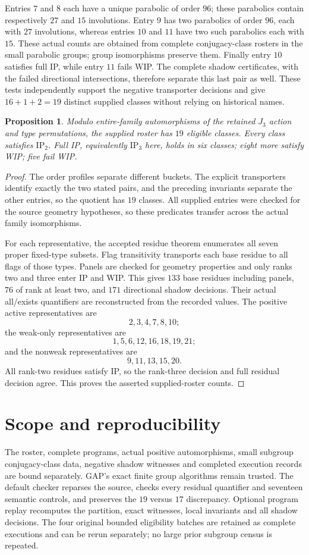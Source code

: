 \documentclass[11pt]{article}
\newtheorem{proposition}{Proposition}
\begin{document}
Entries $7$ and $8$ each have a unique parabolic of order $96$; these
parabolics contain respectively $27$ and $15$ involutions. Entry $9$ has
two parabolics of order $96$, each with $27$ involutions, whereas entries
$10$ and $11$ have two such parabolics each with $15$. These actual counts
are obtained from complete conjugacy-class rosters in the small
parabolic groups; group isomorphisms preserve them. Finally entry $10$
satisfies full IP, while entry $11$ fails WIP. The complete shadow
certificates, with the failed directional intersections, therefore
separate this last pair as well. These tests independently support the
negative transporter decisions and give $16+1+2=19$ distinct supplied
classes without relying on historical names.

\begin{proposition}
Modulo entire-family automorphisms of the retained $J_3$ action and type
permutations, the supplied roster has $19$ eligible classes. Every class
satisfies $\mathrm{IP}_2$. Full IP, equivalently $\mathrm{IP}_3$ here,
holds in six classes; eight more satisfy WIP; five fail WIP.
\end{proposition}
\begin{proof}
The order profiles separate different buckets. The explicit transporters
identify exactly the two stated pairs, and the preceding invariants
separate the other entries, so the quotient has $19$ classes. All supplied
entries were checked for the source geometry hypotheses, so these
predicates transfer across the actual family isomorphisms.

For each representative, the accepted residue theorem enumerates all
seven proper fixed-type subsets. Flag transitivity transports each base
residue to all flags of those types. Panels are checked for geometry
properties and only ranks two and three enter IP and WIP. This gives
$133$ base residues including panels, $76$ of rank at least two, and
$171$ directional shadow decisions. Their actual all/exists quantifiers
are reconstructed from the recorded values. The positive active
representatives are
\[
 2,3,4,7,8,10;
\]
the weak-only representatives are
\[
 1,5,6,12,16,18,19,21;
\]
and the nonweak representatives are
\[
 9,11,13,15,20.
\]
All rank-two residues satisfy IP, so the rank-three decision and full
residual decision agree. This proves the asserted supplied-roster counts.
\end{proof}

\section{Scope and reproducibility}
The roster, complete programs, actual positive automorphisms, small
subgroup conjugacy-class data, negative shadow witnesses and completed
execution records are bound separately. GAP's exact finite group
algorithms remain trusted. The default checker reparses the source,
checks every residual quantifier and seventeen semantic controls, and
preserves the $19$ versus $17$ discrepancy. Optional program replay
recomputes the partition, exact witnesses, local invariants and all
shadow decisions. The four original bounded eligibility batches are
retained as complete executions and can be rerun separately; no large
prior subgroup census is repeated.
\end{document}
